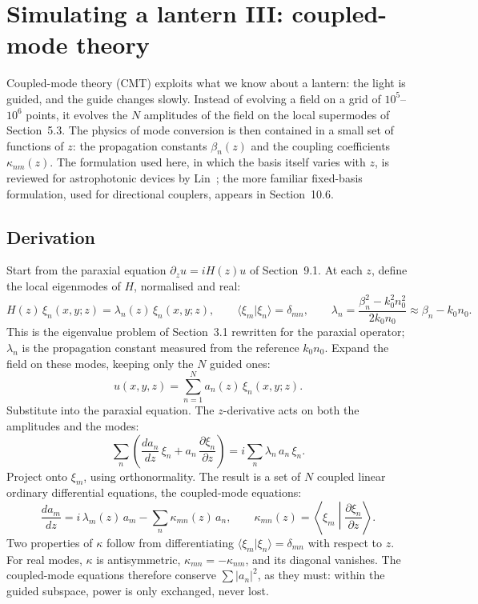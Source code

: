 \documentclass[11pt,a4paper]{article}
\newcommand{\braket}[2]{\langle #1|#2\rangle}
\begin{document}
\section{Simulating a lantern III: coupled-mode theory}

Coupled-mode theory (CMT) exploits what we know about a lantern: the light is guided, and the guide changes slowly. Instead of evolving a field on a grid of $10^5$--$10^6$ points, it evolves the $N$ amplitudes of the field on the local supermodes of Section~5.3. The physics of mode conversion is then contained in a small set of functions of $z$: the propagation constants $\beta_n(z)$ and the coupling coefficients $\kappa_{nm}(z)$. The formulation used here, in which the basis itself varies with $z$, is reviewed for astrophotonic devices by Lin~\cite{Lin2024}; the more familiar fixed-basis formulation, used for directional couplers, appears in Section~10.6.

\subsection{Derivation}
Start from the paraxial equation $\partial_z u = iH(z)u$ of Section~9.1. At each $z$, define the local eigenmodes of $H$, normalised and real:
\begin{equation}
H(z)\,\xi_n(x,y;z) = \lambda_n(z)\,\xi_n(x,y;z),
\qquad
\braket{\xi_m}{\xi_n} = \delta_{mn},
\qquad
\lambda_n = \frac{\beta_n^2 - k_0^2 n_0^2}{2 k_0 n_0} \approx \beta_n - k_0 n_0.
\label{eq:local_eigen}
\end{equation}
This is the eigenvalue problem of Section~3.1 rewritten for the paraxial operator; $\lambda_n$ is the propagation constant measured from the reference $k_0 n_0$. Expand the field on these modes, keeping only the $N$ guided ones:
\begin{equation}
u(x,y,z) = \sum_{n=1}^{N} a_n(z)\,\xi_n(x,y;z).
\label{eq:expansion}
\end{equation}
Substitute into the paraxial equation. The $z$-derivative acts on both the amplitudes and the modes:
\begin{equation}
\sum_n \left( \frac{d a_n}{dz}\,\xi_n + a_n\,\frac{\partial \xi_n}{\partial z} \right) = i \sum_n \lambda_n\, a_n\,\xi_n.
\label{eq:substituted}
\end{equation}
Project onto $\xi_m$, using orthonormality. The result is a set of $N$ coupled linear ordinary differential equations, the coupled-mode equations:
\begin{equation}
\frac{d a_m}{dz} = i\,\lambda_m(z)\, a_m - \sum_n \kappa_{mn}(z)\, a_n,
\qquad
\kappa_{mn}(z) = \left\langle \xi_m \middle| \frac{\partial \xi_n}{\partial z} \right\rangle.
\label{eq:cme}
\end{equation}
Two properties of $\kappa$ follow from differentiating $\braket{\xi_m}{\xi_n} = \delta_{mn}$ with respect to $z$. For real modes, $\kappa$ is antisymmetric, $\kappa_{mn} = -\kappa_{nm}$, and its diagonal vanishes. The coupled-mode equations therefore conserve $\sum |a_n|^2$, as they must: within the guided subspace, power is only exchanged, never lost.
\end{document}
